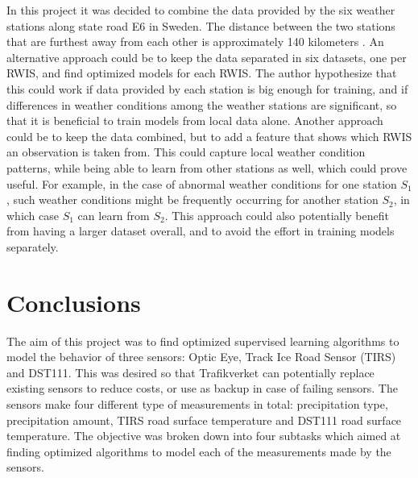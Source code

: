 	In this project it was decided to combine the data provided by the six weather stations along state road E6 in Sweden. The distance between the two stations that are furthest away from each other is approximately 140 kilometers \cite{WEBSITE:35}. An alternative approach could be to keep the data separated in six datasets, one per RWIS, and find optimized models for each RWIS. The author hypothesize that this could work if data provided by each station is big enough for training, and if differences in weather conditions among the weather stations are significant, so that it is beneficial to train models from local data alone. Another approach could be to keep the data combined, but to add a feature that shows which RWIS an observation is taken from. This could capture local weather condition patterns, while being able to learn from other stations as well, which could prove useful. For example, in the case of abnormal weather conditions for one station $S_1$, such weather conditions might be frequently occurring for another station $S_2$, in which case $S_1$ can learn from $S_2$. This approach could also potentially benefit from having a larger dataset overall, and to avoid the effort in training models separately.


	

\section{Conclusions}
	The aim of this project was to find optimized supervised learning algorithms to model the behavior of three sensors: Optic Eye, Track Ice Road Sensor (TIRS) and DST111. This was desired so that Trafikverket can potentially replace existing sensors to reduce costs, or use as backup in case of failing sensors. The sensors make four different type of measurements in total: precipitation type, precipitation amount, TIRS road surface temperature and DST111 road surface temperature. The objective was broken down into four subtasks which aimed at finding optimized algorithms to model each of the measurements made by the sensors.

